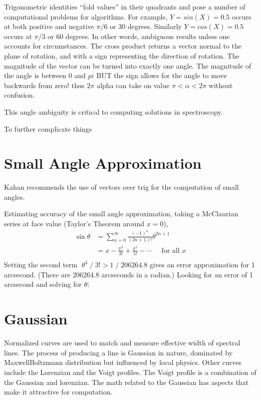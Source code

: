 \documentclass[letterpaper,10pt,english,openany,oneside]{sphinxmanual}
\begin{document}
\sphinxAtStartPar
Trigonometric identities “fold values” in their quadrants and pose a
number of computational problems for algorithms. For example,
\(Y=sin(X) = 0.5\) occurs at both positive and negative
\(\pi/6\) or 30 degrees. Similarly \(Y=cos(X)=0.5\) occurs
at \(\pi/3\) or 60 degrees. In other words, ambiguous results
unless one accounts for circumstances. The cross product returns
a vector normal to the plane of rotation, and with a sign representing
the direction of rotation. The magnitude of the vector can be turned
into exactly one angle. The magnitude of the angle is between \(0\) and
\(pi\) BUT the sign allows for the angle to move backwards from zero!
thus \(2\pi\) \sphinxhyphen{} alpha can take on value \(\pi < \alpha < 2\pi\)
without confusion.

\sphinxAtStartPar
This angle ambiguity is critical to computing solutions in spectroscopy.

\sphinxAtStartPar
To further complicate things


\section{Small Angle Approximation}
\label{\detokenize{mathematics:small-angle-approximation}}
\sphinxAtStartPar
Kahan  recommends the use of vectors over trig for the computation
of small angles.

\sphinxAtStartPar
Estimating accuracy of the small angle approximation, taking a
McClaurian series at face value (Taylor’s Theorem around \(x=0\)),
\begin{equation}\label{equation:mathematics:SmallAngleApproximation}
\begin{split} \sin \theta &= \sum^{\infty}_{n=0} \frac{(-1)^n}{(2n+1)!} \theta^{2n+1} \\
    &= x - \frac{x^3}{3!} + \frac{x^5}{5!} - \cdots\quad\text{ for all } x\! \\\end{split}
\end{equation}
\sphinxAtStartPar
Setting the second term \(\;\theta^3\;/\;3! > 1\;/\;206264.8\)
gives an error approximation for 1 arcsecond. (There are 206264.8 arc\sphinxhyphen{}seconds in a radian.)
Looking for an error of 1 arcsecond and solving for \(\theta\):


\section{Gaussian}
\label{\detokenize{mathematics:gaussian}}
\sphinxAtStartPar
Normalized curves are used to match and measure effective width of
spectral lines. The process of producing a line is Gaussian in nature,
dominated by Maxwell\sphinxhyphen{}Boltzmann distribution but influenced by local
physics. Other curves include the Lorenzian and the Voigt profiles.
The Voigt profile is a combination of the Gaussian and lorenzian.
The math related to the Gaussian has aspects that make it attractive
for computation.
\end{document}
